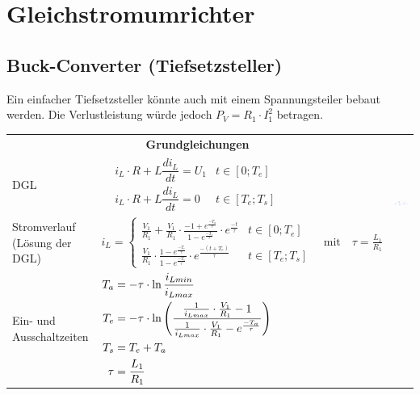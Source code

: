 \section{Gleichstromumrichter}
\subsection{Buck-Converter (Tiefsetzsteller)}

Ein einfacher Tiefsetzsteller könnte auch mit einem Spannungsteiler bebaut werden.
Die Verlustleistung würde jedoch $P_{V} = R_{1} \cdot I_{1}^2$ betragen.


\begin{longtable}{|p{}|l|p{}}
	\cline{1-2}
	\multicolumn{2}{|c|}{\textbf{Grundgleichungen}}
	& \multirow{3}{*}{\includegraphics[width = \linewidth]{./pictures/buck.png}}\\
	\cline{1-2}
	DGL
		& $\begin{aligned}
			& i_{L} \cdot R + L\dfrac{di_{L}}{dt} = U_1  & t \in [0; T_{e}]\\
			& i_{L} \cdot R + L\dfrac{di_{L}}{dt} = 0  & t \in [T_{e}; T_{s}]
		\end{aligned}$ & \\[5mm]
	\cline{1-2}
	Stromverlauf (Lösung der DGL)
		& $i_L = \begin{cases}
					\frac{V_{1}}{R_{1}}+\frac{V_{1}}{R_{1}} \cdot \frac{-1+e^{\frac{-T_{a}}{\tau}}}{1-e^{\frac{-T_{s}}{\tau}}} \cdot e^{\frac{-t}{\tau}} & t \in [0; T_{e}]\\
					\frac{V_{1}}{R_{1}} \cdot \frac{1-e^{\frac{-T_{e}}{\tau}}}{1-e^{\frac{-T_{s}}{\tau}}} \cdot e^{\frac{-(t+T_{e})}{\tau}} & t \in [T_{e}; T_{s}]
			\end{cases}\quad \text{mit} \quad \tau = \frac{L_{1}}{R_{1}}$& \\
	\cline{1-2}
	Ein- und Ausschaltzeiten
		& $\begin{aligned}
			T_{a} &= -\tau \cdot \ln\frac{i_{Lmin}}{i_{Lmax}}\\
			T_{e} &= -\tau \cdot \ln\left(\frac{\frac{1}{i_{Lmax}} \cdot \frac{V_{1}}{R_{1}} - 1}{\frac{1}{i_{Lmax}} \cdot \frac{V_{1}}{R_{1}}-e^{\frac{-T_{a}}{\tau}}}\right)\\
			T_{s} &= T_{e} + T_{a}\\
			\tau &= \frac{L_{1}}{R_{1}}
		\end{aligned}$ &\\
	\cline{1-2}
\end{longtable}
